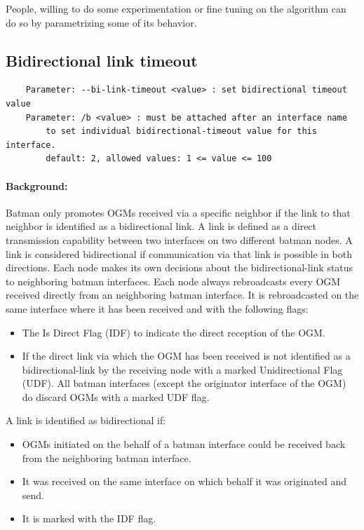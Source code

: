 \documentclass[11pt]{article}
\begin{document}
People, willing to do some experimentation or fine tuning on the algorithm can do so by parametrizing some of its behavior.


\subsection{Bidirectional link timeout}

\begin{small}
\begin{verbatim}
    Parameter: --bi-link-timeout <value> : set bidirectional timeout value
    Parameter: /b <value> : must be attached after an interface name
        to set individual bidirectional-timeout value for this interface. 
        default: 2, allowed values: 1 <= value <= 100
\end{verbatim}
\end{small}

\paragraph{Background:} Batman only promotes OGMs received via a specific neighbor if the link to that neighbor is identified as a bidirectional link. 
%
A link is defined as a direct transmission capability between two interfaces on two different batman nodes. 
%
A link is considered bidirectional if communication via that link is possible in both directions. 
Each node makes its own decisions about the bidirectional-link status to neighboring batman interfaces.
%
Each node always rebroadcasts every OGM received directly from an neighboring batman interface. 
It is rebroadcasted on the same interface where it has been received and with the following flags:
\begin{itemize}

\item The Is Direct Flag (IDF) to indicate the direct reception of the OGM. 
 
\item If the direct link via which the OGM has been received is not identified as a bidirectional-link by the receiving node with a marked Unidirectional Flag (UDF). All batman interfaces (except the originator interface of the OGM) do discard OGMs with a marked UDF flag. 

\end{itemize}

A link is identified as bidirectional if:

\begin{itemize}
\item OGMs initiated on the behalf of a batman interface could be received back from the neighboring batman interface.
\item It was received on the same interface on which behalf it was originated and send.
\item It is marked with the IDF flag.
\end{itemize}
\end{document}
